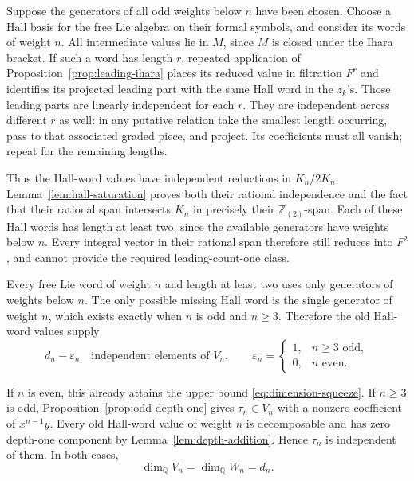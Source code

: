 \documentclass[11pt]{article}
\newcommand{\Q}{\mathbb Q}
\newcommand{\Z}{\mathbb Z}
\theoremstyle{definition}
\theoremstyle{remark}
\numberwithin{equation}{section}
\begin{document}
Suppose the generators of all odd weights below \(n\) have been
chosen.  Choose a Hall basis for the free Lie algebra on their
formal symbols, and consider its words of weight \(n\).
All intermediate values lie in \(M\), since \(M\) is closed under
the Ihara bracket.
If such a word has length \(r\), repeated application of
Proposition~\ref{prop:leading-ihara} places its reduced value in
filtration \(F^r\) and identifies its projected leading part with
the same Hall word in the \(z_k\)'s.
Those leading parts are linearly independent for each \(r\).
They are independent across different \(r\) as well: in any
putative relation take the smallest length occurring, pass to
that associated graded piece, and project.  Its coefficients
must all vanish; repeat for the remaining lengths.

Thus the Hall-word values have independent reductions in
\(K_n/2K_n\).  Lemma~\ref{lem:hall-saturation} proves both their
rational independence and the fact that their rational span
intersects \(K_n\) in precisely their \(\Z_{(2)}\)-span.
Each of these Hall words has length at least two, since the
available generators have weights below \(n\).  Every integral
vector in their rational span therefore still reduces into
\(F^2\), and cannot provide the required leading-count-one class.

Every free Lie word of weight \(n\) and length at least two uses
only generators of weights below \(n\).  The only possible
missing Hall word is the single generator of weight \(n\), which
exists exactly when \(n\) is odd and \(n\ge3\).  Therefore the old
Hall-word values supply
\[
 d_n-\varepsilon_n
 \quad\text{independent elements of }V_n,\qquad
 \varepsilon_n=
 \begin{cases}
  1,&n\ge3\text{ odd},\\
  0,&n\text{ even}.
 \end{cases}
\]

If \(n\) is even, this already attains the upper bound
\eqref{eq:dimension-squeeze}.  If \(n\ge3\) is odd,
Proposition~\ref{prop:odd-depth-one} gives
\(\tau_n\in V_n\) with a nonzero coefficient of \(x^{n-1}y\).
Every old Hall-word value of weight \(n\) is decomposable and
has zero depth-one component by Lemma~\ref{lem:depth-addition}.
Hence \(\tau_n\) is independent of them.  In both cases,
\begin{equation}\label{eq:dimension-equality}
 \dim_\Q V_n=\dim_\Q W_n=d_n.
\end{equation}
\end{document}
